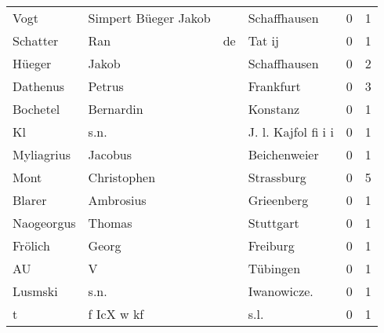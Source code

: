 \begin{tabular}{llllrr}
                     Vogt &               Simpert Büeger Jakob &             &                                Schaffhausen &          0 &         1 \\
                 Schatter &                                Ran &          de &                                      Tat ij &          0 &         1 \\
                   Hüeger &                              Jakob &             &                                Schaffhausen &          0 &         2 \\
                 Dathenus &                             Petrus &             &                                   Frankfurt &          0 &         3 \\
                 Bochetel &                          Bernardin &             &                                    Konstanz &          0 &         1 \\
                       Kl &                               s.n. &             &                         J. l. Kajfol fi i i &          0 &         1 \\
               Myliagrius &                            Jacobus &             &                                Beichenweier &          0 &         1 \\
                     Mont &                        Christophen &             &                                  Strassburg &          0 &         5 \\
                   Blarer &                          Ambrosius &             &                                  Grieenberg &          0 &         1 \\
               Naogeorgus &                             Thomas &             &                                   Stuttgart &          0 &         1 \\
                  Frölich &                              Georg &             &                                    Freiburg &          0 &         1 \\
                       AU &                                  V &             &                                    Tübingen &          0 &         1 \\
                  Lusmski &                               s.n. &             &                                Iwanowicze.  &          0 &         1 \\
                        t &                         f IcX w kf &             &                                        s.l. &          0 &         1 \\

\end{tabular}
